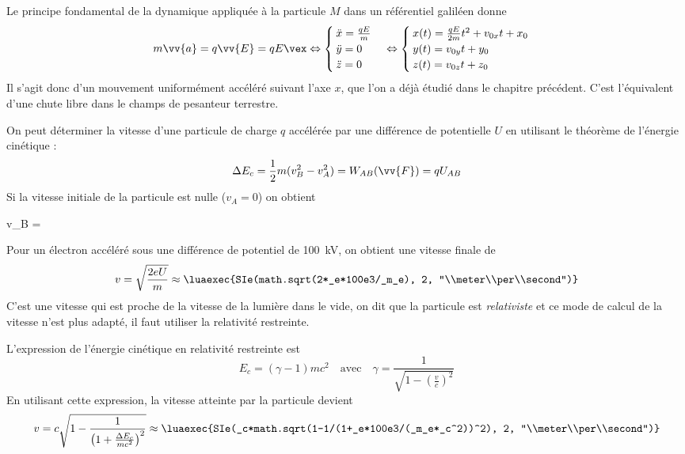 \documentclass{cours}
\begin{document}
Le principe fondamental de la dynamique appliquée à la particule $M$ dans un référentiel galiléen donne 
\begin{equation}
m\vv{a} = q\vv{E} = qE \vex \Leftrightarrow 
\begin{cases}
  \ddot{x} = \frac{qE}{m}\\
  \ddot{y} = 0 \\
  \ddot{z} = 0
\end{cases}
\Leftrightarrow
\begin{cases}
  x(t) = \frac{qE}{2m}t^2 + v_{0x}t + x_0\\
  y(t) = v_{0y}t + y_0\\
  z(t) = v_{0z}t + z_0
\end{cases}
\end{equation}
Il s'agit donc d'un mouvement uniformément accéléré suivant l'axe $x$, que l'on a déjà étudié dans le chapitre précédent. C'est l'équivalent d'une chute libre dans le champs de pesanteur terrestre. 

On peut déterminer la vitesse d'une particule de charge $q$ accélérée par une différence de potentielle $U$ en utilisant le théorème de l'énergie cinétique :
\begin{equation}
  \Delta E_c =\frac{1}{2}m(v_B^2-v_A^2)= W_{AB}(\vv{F}) = qU_{AB}
\end{equation}
Si la vitesse initiale de la particule est nulle ($v_A=0$) on obtient 
\begin{eqencadre}
  v_B = 
\end{eqencadre}
Pour un électron accéléré sous une différence de potentiel de \SI{100}{\kilo\volt}, on obtient une vitesse finale de 
\begin{equation}
  v = \sqrt{\frac{2eU}{m}} \approx \luaexec{SIe(math.sqrt(2*_e*100e3/_m_e), 2, "\\meter\\per\\second")}
\end{equation}
C'est une vitesse qui est proche de la vitesse de la lumière dans le vide, on dit que la particule est \emph{relativiste} et ce mode de calcul de la vitesse n'est plus adapté, il faut utiliser la relativité restreinte.

L'expression de l'énergie cinétique en relativité restreinte est 
\begin{equation}
  E_c = (\gamma-1) mc^2 \quad \text{avec}\quad \gamma = \frac{1}{\sqrt{1-\left(\frac{v}{c}\right)^2}}
\end{equation}
En utilisant cette expression, la vitesse atteinte par la particule devient 
\begin{equation}
  v = c \sqrt{1-\frac{1}{\left(1+\frac{\Delta E_c}{mc^2}\right)^2}} \approx  \luaexec{SIe(_c*math.sqrt(1-1/(1+_e*100e3/(_m_e*_c^2))^2), 2, "\\meter\\per\\second")}
\end{equation}
\end{document}
